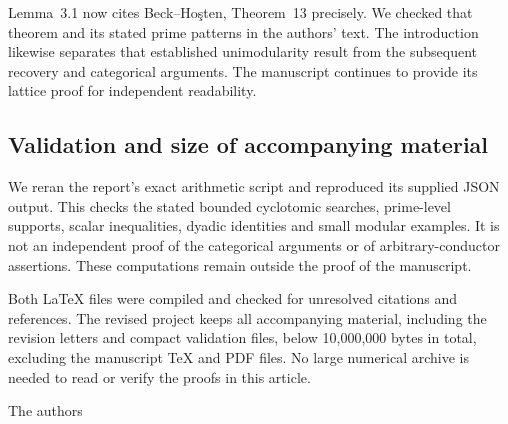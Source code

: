 \documentclass[11pt,a4paper]{article}
\newcommand{\issue}[1]{\subsection*{#1}}
\begin{document}
Lemma~3.1 now cites Beck--Ho\c{s}ten, Theorem~13 precisely. We checked that theorem and its stated prime patterns in the authors' text. The introduction likewise separates that established unimodularity result from the subsequent recovery and categorical arguments. The manuscript continues to provide its lattice proof for independent readability.

\issue{Validation and size of accompanying material}
We reran the report's exact arithmetic script and reproduced its supplied JSON output. This checks the stated bounded cyclotomic searches, prime-level supports, scalar inequalities, dyadic identities and small modular examples. It is not an independent proof of the categorical arguments or of arbitrary-conductor assertions. These computations remain outside the proof of the manuscript.

Both LaTeX files were compiled and checked for unresolved citations and references. The revised project keeps all accompanying material, including the revision letters and compact validation files, below 10,000,000 bytes in total, excluding the manuscript TeX and PDF files. No large numerical archive is needed to read or verify the proofs in this article.

\medskip
The authors
\end{document}
